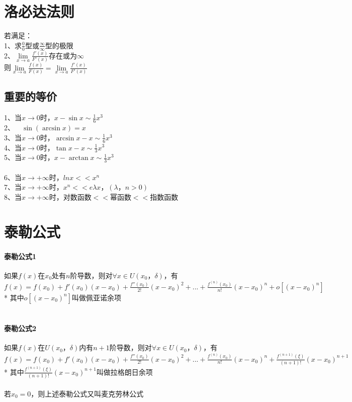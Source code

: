 \documentclass{article}
\begin{document}
\begin{flushleft}
	\section{洛必达法则}
	
	若满足：\\
	1、求$\frac{0}{0}$型或$\frac{\infty}{\infty}$型的极限\\
	2、$\lim\limits_{x\to a}\frac{f'(x)}{F'(x)}$存在或为$\infty$\\
	则$\lim\limits_{x\to a}\frac{f(x)}{F(x)}=\lim\limits_{x\to a}\frac{f'(x)}{F'(x)}$\\
	
	\subsection{重要的等价}
	
	1、当$x\to 0$时，$x-\sin x \sim \frac{1}{6}x^3$\\
	2、\ \ $\sin(\arcsin x)=x$\\
	3、当$x\to 0$时，$\arcsin x-x \sim \frac{1}{6}x^3$\\
	4、当$x\to 0$时，$\tan x-x \sim \frac{1}{3}x^3$\\
	5、当$x\to 0$时，$x-\arctan x \sim \frac{1}{3}x^3$\\
	~\\
	6、当$x\to +\infty$时，$lnx << x^n$\\
	7、当$x\to +\infty$时，$x^n << e{\lambda x}，(\lambda，n>0)$\\
	8、当$x\to +\infty$时，对数函数$<<$幂函数$<<$指数函数\\
	
	\section{泰勒公式}
	
	\paragraph{泰勒公式1}
	如果$f(x)$在$x_0$处有$n$阶导数，则对$\forall x \in U(x_0，\delta)$，有$f(x)=f(x_0)+f'(x_0)(x-x_0)+\frac{f''(x_0)}{2!}(x-x_0)^2+...+\frac{f^{(n)}(x_0)}{n!}(x-x_0)^n+o[(x-x_0)^n]$\\
	* 其中$o[(x-x_0)^n]$叫做佩亚诺余项\\
	~\\
	\paragraph{泰勒公式2}
	如果$f(x)$在$U(x_0，\delta)$内有$n+1$阶导数，则对$\forall x \in U(x_0，\delta)$，有$f(x)=f(x_0)+f'(x_0)(x-x_0)+\frac{f''(x_0)}{2!}(x-x_0)^2+...+\frac{f^{(n)}(x_0)}{n!}(x-x_0)^n+\frac{f^{(n+1)}(\xi)}{(n+1)!}(x-x_0)^{n+1}$\\
	* 其中$\frac{f^{(n+1)}(\xi)}{(n+1)!}(x-x_0)^{n+1}$叫做拉格朗日余项\\
	~\\
	若$x_0=0$，则上述泰勒公式又叫麦克劳林公式\\
	

\end{flushleft}
\end{document}
